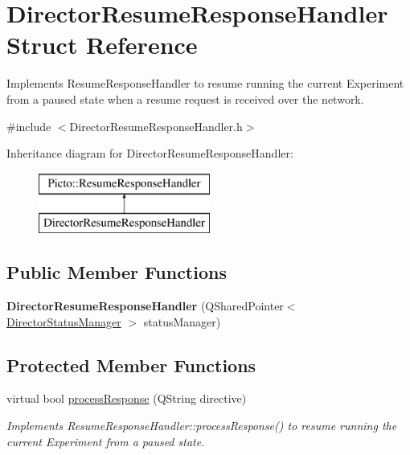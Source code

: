 \hypertarget{struct_director_resume_response_handler}{\section{Director\-Resume\-Response\-Handler Struct Reference}
\label{struct_director_resume_response_handler}
}


Implements Resume\-Response\-Handler to resume running the current Experiment from a paused state when a resume request is received over the network.  




{\ttfamily \#include $<$Director\-Resume\-Response\-Handler.\-h$>$}

Inheritance diagram for Director\-Resume\-Response\-Handler\-:\begin{figure}[H]
\begin{center}
\leavevmode
\includegraphics[height=2.000000cm]{struct_director_resume_response_handler}
\end{center}
\end{figure}
\subsection*{Public Member Functions}
\begin{DoxyCompactItemize}
\item 
\hypertarget{struct_director_resume_response_handler_ab8e26be567fcc7864e1f938def654566}{{\bfseries Director\-Resume\-Response\-Handler} (Q\-Shared\-Pointer$<$ \hyperlink{class_director_status_manager}{Director\-Status\-Manager} $>$ status\-Manager)}\label{struct_director_resume_response_handler_ab8e26be567fcc7864e1f938def654566}

\end{DoxyCompactItemize}
\subsection*{Protected Member Functions}
\begin{DoxyCompactItemize}
\item 
\hypertarget{struct_director_resume_response_handler_a51bff1926067b34ffdc82f7999a6f8d3}{virtual bool \hyperlink{struct_director_resume_response_handler_a51bff1926067b34ffdc82f7999a6f8d3}{process\-Response} (Q\-String directive)}\label{struct_director_resume_response_handler_a51bff1926067b34ffdc82f7999a6f8d3}

\begin{DoxyCompactList}\small\item\em Implements Resume\-Response\-Handler\-::process\-Response() to resume running the current Experiment from a paused state. \end{DoxyCompactList}\end{DoxyCompactItemize}



